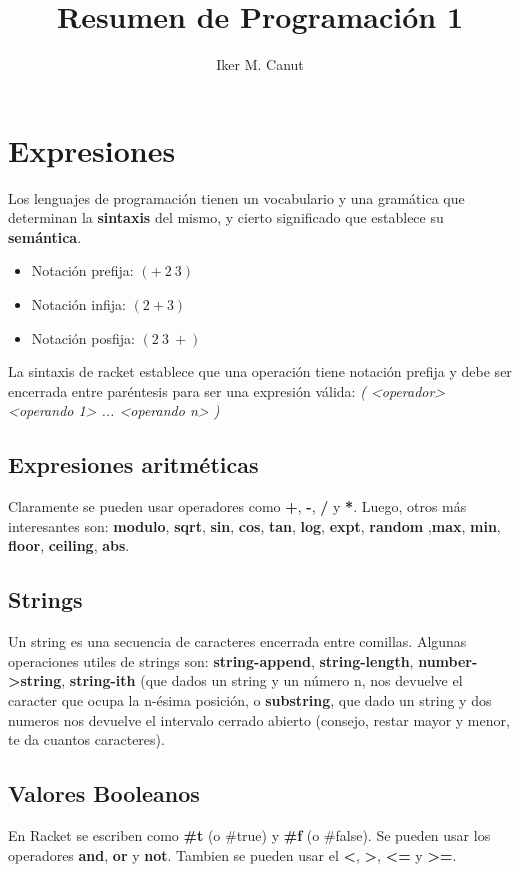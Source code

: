 \documentclass[11pt,a4paper]{article}
\begin{document}
\title{Resumen de Programación 1}
\author{Iker M. Canut}
\maketitle
\newpage

\section{Expresiones}
Los lenguajes de programación tienen un vocabulario y una gramática que determinan la \textbf{sintaxis} del mismo, y cierto significado que establece su \textbf{semántica}.
\begin{multicols}{3}
\begin{itemize}
\item Notación prefija: $(+\ 2\ 3)$
\item Notación infija:  $(2 + 3)$ 
\item Notación posfija: $(2\ 3\ +)$ 
\end{itemize}
\end{multicols}
La sintaxis de racket establece que una operación tiene notación prefija y debe ser encerrada entre paréntesis para ser una expresión válida: \textit{( <operador> <operando 1> ... <operando n> )}

\subsection{Expresiones aritméticas}
Claramente se pueden usar operadores como \textbf{+}, \textbf{-}, \textbf{/} y \textbf{*}. Luego, otros más interesantes son: \textbf{modulo}, \textbf{sqrt}, \textbf{sin}, \textbf{cos}, \textbf{tan}, \textbf{log}, \textbf{expt}, \textbf{random} ,\textbf{max}, \textbf{min}, \textbf{floor}, \textbf{ceiling}, \textbf{abs}.

\subsection{Strings}
Un string es una secuencia de caracteres encerrada entre comillas. Algunas operaciones utiles de strings son: \textbf{string-append}, \textbf{string-length}, \textbf{number->string}, \textbf{string-ith} (que dados un string y un n\'umero n, nos devuelve el caracter que ocupa la n-ésima posición, o \textbf{substring}, que dado un string y dos numeros nos devuelve el intervalo cerrado abierto (consejo, restar mayor y menor, te da cuantos caracteres).

\subsection{Valores Booleanos}
En Racket se escriben como \textbf{\#t} (o \#true) y \textbf{\#f} (o \#false). Se pueden usar los operadores \textbf{and}, \textbf{or} y \textbf{not}. Tambien se pueden usar el \textbf{<}, \textbf{>}, \textbf{<=} y \textbf{>=}.
\end{document}

